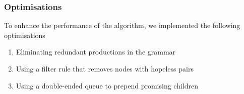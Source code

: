 \documentclass[10pt]{beamer}
\begin{document}

\begin{frame}
  \frametitle{Optimisations}
  To enhance the performance of the algorithm, we implemented the following optimisations
  \begin{enumerate}
  \item Eliminating redundant productions in the grammar
    \vskip 0.5cm
  \item Using a filter rule that removes nodes with hopeless pairs
    \vskip 0.5cm    
  \item Using a double-ended queue to prepend promising children
  \end{enumerate}
\end{frame}
\end{document}
